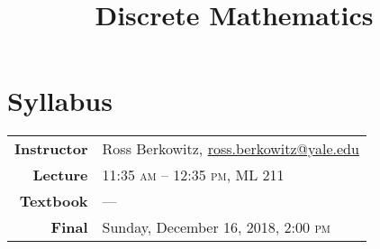 \documentclass{notes}
\title{Discrete Mathematics}
\begin{document}
\section*{Syllabus}

\begin{center}
\begin{tabular}{@{}rp{10cm}@{}}
\toprule
\textbf{Instructor} & Ross Berkowitz, \url{ross.berkowitz@yale.edu} \\
\textbf{Lecture} & 11:35 \textsc{am} -- 12:35 \textsc{pm}, ML 211 \\
\textbf{Textbook} & --- \\
\textbf{Final} & Sunday, December 16, 2018, 2:00 \textsc{pm} \\
\bottomrule
\end{tabular} \\[3ex]
\end{center}
\end{document}
